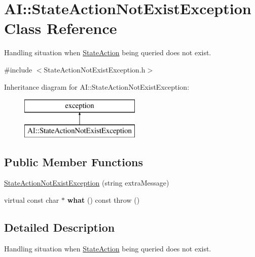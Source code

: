 \hypertarget{classAI_1_1StateActionNotExistException}{\section{A\-I\-:\-:State\-Action\-Not\-Exist\-Exception Class Reference}
\label{classAI_1_1StateActionNotExistException}
}


Handling situation when \hyperlink{classAI_1_1StateAction}{State\-Action} being queried does not exist.  




{\ttfamily \#include $<$State\-Action\-Not\-Exist\-Exception.\-h$>$}

Inheritance diagram for A\-I\-:\-:State\-Action\-Not\-Exist\-Exception\-:\begin{figure}[H]
\begin{center}
\leavevmode
\includegraphics[height=2.000000cm]{classAI_1_1StateActionNotExistException}
\end{center}
\end{figure}
\subsection*{Public Member Functions}
\begin{DoxyCompactItemize}
\item 
\hyperlink{classAI_1_1StateActionNotExistException_abcba2ae2e7a93a728595704c3440e778}{State\-Action\-Not\-Exist\-Exception} (string extra\-Message)
\item 
\hypertarget{classAI_1_1StateActionNotExistException_a787f165434d1a3d4d9c7e5f9a3fa302a}{virtual const char $\ast$ {\bfseries what} () const   throw ()}\label{classAI_1_1StateActionNotExistException_a787f165434d1a3d4d9c7e5f9a3fa302a}

\end{DoxyCompactItemize}


\subsection{Detailed Description}
Handling situation when \hyperlink{classAI_1_1StateAction}{State\-Action} being queried does not exist. 

